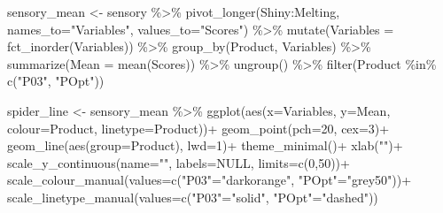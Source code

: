 \documentclass[
]{krantz}
\makeatletter
\newenvironment{Shaded}{\begin{snugshade}}{\end{snugshade}}
\newcommand{\AttributeTok}[1]{\textcolor[rgb]{0.61,0.61,0.61}{#1}}
\newcommand{\ConstantTok}[1]{\textcolor[rgb]{0,0,0}{#1}}
\newcommand{\DecValTok}[1]{\textcolor[rgb]{0.06,0.06,0.06}{#1}}
\newcommand{\FunctionTok}[1]{\textcolor[rgb]{0,0,0}{#1}}
\newcommand{\NormalTok}[1]{#1}
\newcommand{\OtherTok}[1]{\textcolor[rgb]{0.37,0.37,0.37}{#1}}
\newcommand{\SpecialCharTok}[1]{\textcolor[rgb]{0,0,0}{#1}}
\newcommand{\StringTok}[1]{\textcolor[rgb]{0.5,0.5,0.5}{#1}}
\newenvironment{kframe}{%
\medskip{}
\setlength{\fboxsep}{.8em}
 \def\at@end@of@kframe{}%
 \ifinner\ifhmode%
  \def\at@end@of@kframe{\end{minipage}}%
  \begin{minipage}{\columnwidth}%
 \fi\fi%
 \def\FrameCommand##1{\hskip\@totalleftmargin \hskip-\fboxsep
 \colorbox{shadecolor}{##1}\hskip-\fboxsep
     \hskip-\linewidth \hskip-\@totalleftmargin \hskip\columnwidth}%
 \MakeFramed {\advance\hsize-\width
   \@totalleftmargin\z@ \linewidth\hsize
   \@setminipage}}%
 {\par\unskip\endMakeFramed%
 \at@end@of@kframe}
\renewenvironment{Shaded}{\begin{kframe}}{\end{kframe}}
\makeatother
\begin{document}
\begin{Shaded}
\begin{Highlighting}[]
\NormalTok{sensory\_mean }\OtherTok{\textless{}{-}}\NormalTok{ sensory }\SpecialCharTok{\%\textgreater{}\%} 
  \FunctionTok{pivot\_longer}\NormalTok{(Shiny}\SpecialCharTok{:}\NormalTok{Melting, }
               \AttributeTok{names\_to=}\StringTok{"Variables"}\NormalTok{, }\AttributeTok{values\_to=}\StringTok{"Scores"}\NormalTok{) }\SpecialCharTok{\%\textgreater{}\%} 
  \FunctionTok{mutate}\NormalTok{(}\AttributeTok{Variables =} \FunctionTok{fct\_inorder}\NormalTok{(Variables)) }\SpecialCharTok{\%\textgreater{}\%} 
  \FunctionTok{group\_by}\NormalTok{(Product, Variables) }\SpecialCharTok{\%\textgreater{}\%} 
  \FunctionTok{summarize}\NormalTok{(}\AttributeTok{Mean =} \FunctionTok{mean}\NormalTok{(Scores)) }\SpecialCharTok{\%\textgreater{}\%} 
  \FunctionTok{ungroup}\NormalTok{() }\SpecialCharTok{\%\textgreater{}\%} 
  \FunctionTok{filter}\NormalTok{(Product }\SpecialCharTok{\%in\%} \FunctionTok{c}\NormalTok{(}\StringTok{"P03"}\NormalTok{, }\StringTok{"POpt"}\NormalTok{))}

\NormalTok{spider\_line }\OtherTok{\textless{}{-}}\NormalTok{ sensory\_mean }\SpecialCharTok{\%\textgreater{}\%} 
  \FunctionTok{ggplot}\NormalTok{(}\FunctionTok{aes}\NormalTok{(}\AttributeTok{x=}\NormalTok{Variables, }\AttributeTok{y=}\NormalTok{Mean, }\AttributeTok{colour=}\NormalTok{Product, }\AttributeTok{linetype=}\NormalTok{Product))}\SpecialCharTok{+}
  \FunctionTok{geom\_point}\NormalTok{(}\AttributeTok{pch=}\DecValTok{20}\NormalTok{, }\AttributeTok{cex=}\DecValTok{3}\NormalTok{)}\SpecialCharTok{+}
  \FunctionTok{geom\_line}\NormalTok{(}\FunctionTok{aes}\NormalTok{(}\AttributeTok{group=}\NormalTok{Product), }\AttributeTok{lwd=}\DecValTok{1}\NormalTok{)}\SpecialCharTok{+}
  \FunctionTok{theme\_minimal}\NormalTok{()}\SpecialCharTok{+}
  \FunctionTok{xlab}\NormalTok{(}\StringTok{""}\NormalTok{)}\SpecialCharTok{+}
  \FunctionTok{scale\_y\_continuous}\NormalTok{(}\AttributeTok{name=}\StringTok{""}\NormalTok{, }\AttributeTok{labels=}\ConstantTok{NULL}\NormalTok{, }\AttributeTok{limits=}\FunctionTok{c}\NormalTok{(}\DecValTok{0}\NormalTok{,}\DecValTok{50}\NormalTok{))}\SpecialCharTok{+}
  \FunctionTok{scale\_colour\_manual}\NormalTok{(}\AttributeTok{values=}\FunctionTok{c}\NormalTok{(}\StringTok{"P03"}\OtherTok{=}\StringTok{"darkorange"}\NormalTok{, }\StringTok{"POpt"}\OtherTok{=}\StringTok{"grey50"}\NormalTok{))}\SpecialCharTok{+}
  \FunctionTok{scale\_linetype\_manual}\NormalTok{(}\AttributeTok{values=}\FunctionTok{c}\NormalTok{(}\StringTok{"P03"}\OtherTok{=}\StringTok{"solid"}\NormalTok{, }\StringTok{"POpt"}\OtherTok{=}\StringTok{"dashed"}\NormalTok{))}
\end{Highlighting}
\end{Shaded}
\end{document}
